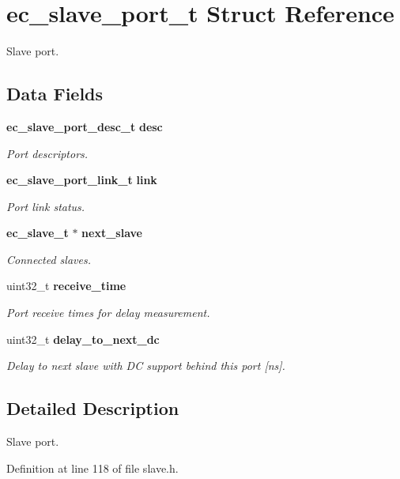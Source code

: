 \section{ec\-\_\-slave\-\_\-port\-\_\-t Struct Reference}
\label{structec__slave__port__t}


Slave port.  


\subsection*{Data Fields}
\begin{DoxyCompactItemize}
\item 
{\bf ec\-\_\-slave\-\_\-port\-\_\-desc\-\_\-t} {\bf desc}
\begin{DoxyCompactList}\small\item\em Port descriptors. \end{DoxyCompactList}\item 
{\bf ec\-\_\-slave\-\_\-port\-\_\-link\-\_\-t} {\bf link}
\begin{DoxyCompactList}\small\item\em Port link status. \end{DoxyCompactList}\item 
{\bf ec\-\_\-slave\-\_\-t} $\ast$ {\bf next\-\_\-slave}
\begin{DoxyCompactList}\small\item\em Connected slaves. \end{DoxyCompactList}\item 
uint32\-\_\-t {\bf receive\-\_\-time}
\begin{DoxyCompactList}\small\item\em Port receive times for delay measurement. \end{DoxyCompactList}\item 
uint32\-\_\-t {\bf delay\-\_\-to\-\_\-next\-\_\-dc}
\begin{DoxyCompactList}\small\item\em Delay to next slave with D\-C support behind this port [ns]. \end{DoxyCompactList}\end{DoxyCompactItemize}


\subsection{Detailed Description}
Slave port. 

Definition at line 118 of file slave.\-h.



